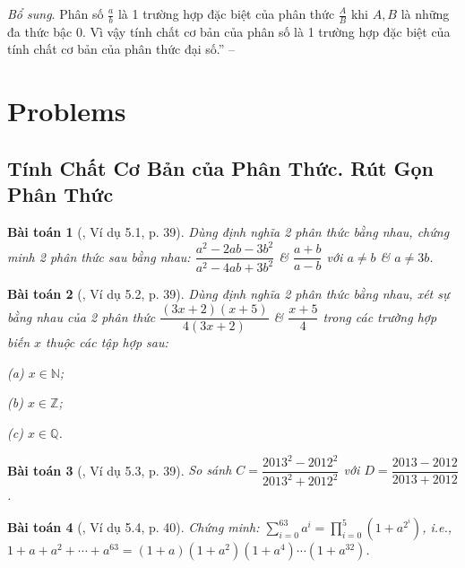 \documentclass{article}
\numberwithin{equation}{section}
\newtheorem{baitoan}{Bài toán}[section]
\begin{document}
\textit{Bổ sung}. Phân số $\frac{a}{b}$ là 1 trường hợp đặc biệt của phân thức $\frac{A}{B}$ khi $A,B$ là những đa thức bậc 0. Vì vậy tính chất cơ bản của phân số là 1 trường hợp đặc biệt của tính chất cơ bản của phân thức đại số.'' -- \cite[pp. 37--38]{Tuyen_Toan_8}


\section{Problems}

\subsection{Tính Chất Cơ Bản của Phân Thức. Rút Gọn Phân Thức}

\begin{baitoan}[\cite{Binh_Nam_Ngoc_Son_Toan_8_Dai_So}, Ví dụ 5.1, p. 39]
	Dùng định nghĩa 2 phân thức bằng nhau, chứng minh 2 phân thức sau bằng nhau: $\dfrac{a^2 - 2ab - 3b^2}{a^2 - 4ab + 3b^2}$ \& $\dfrac{a + b}{a - b}$ với $a\ne b$ \& $a\ne 3b$.
\end{baitoan}

\begin{baitoan}[\cite{Binh_Nam_Ngoc_Son_Toan_8_Dai_So}, Ví dụ 5.2, p. 39]
	Dùng định nghĩa 2 phân thức bằng nhau, xét sự bằng nhau của 2 phân thức $\dfrac{(3x + 2)(x + 5)}{4(3x + 2)}$ \& $\dfrac{x + 5}{4}$ trong các trường hợp biến $x$ thuộc các tập hợp sau:
	\begin{enumerate*}
		\item[(a)] $x\in\mathbb{N}$;
		\item[(b)] $x\in\mathbb{Z}$;
		\item[(c)] $x\in\mathbb{Q}$.
	\end{enumerate*}
\end{baitoan}

\begin{baitoan}[\cite{Binh_Nam_Ngoc_Son_Toan_8_Dai_So}, Ví dụ 5.3, p. 39]
	So sánh $C = \dfrac{2013^2 - 2012^2}{2013^2 + 2012^2}$ với $D = \dfrac{2013 - 2012}{2013 + 2012}$.
\end{baitoan}

\begin{baitoan}[\cite{Binh_Nam_Ngoc_Son_Toan_8_Dai_So}, Ví dụ 5.4, p. 40]
	Chứng minh: $\sum_{i=0}^{63} a^i = \prod_{i=0}^{5} (1 + a^{2^i})$, i.e., $1 + a + a^2 + \cdots + a^{63} = (1 + a)(1 + a^2)(1 + a^4)\cdots(1 + a^{32})$.
\end{baitoan}
\end{document}
